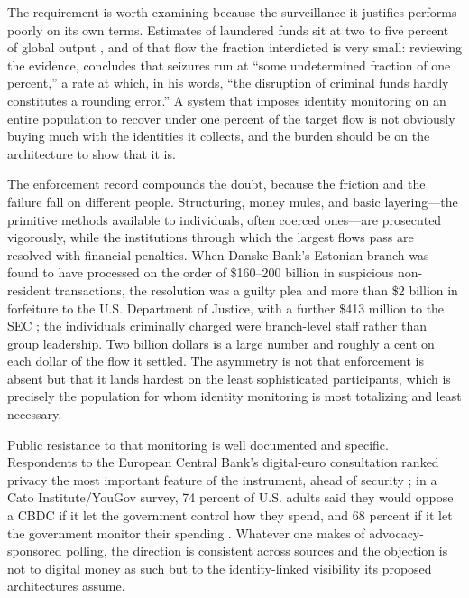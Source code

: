 \documentclass[11pt]{article}
\begin{document}
The requirement is worth examining because the surveillance it justifies performs poorly on its own
terms. Estimates of laundered funds sit at two to five percent of global output \citep{UNODC2011},
and of that flow the fraction interdicted is very small: reviewing the evidence, \citet{Pol2020}
concludes that seizures run at ``some undetermined fraction of one percent,'' a rate at which, in his
words, ``the disruption of criminal funds hardly constitutes a rounding error.'' A system that
imposes identity monitoring on an entire population to recover under one percent of the target flow
is not obviously buying much with the identities it collects, and the burden should be on the
architecture to show that it is.

The enforcement record compounds the doubt, because the friction and the failure fall on different
people. Structuring, money mules, and basic layering---the primitive methods available to
individuals, often coerced ones---are prosecuted vigorously, while the institutions through which the
largest flows pass are resolved with financial penalties. When Danske Bank's Estonian branch was
found to have processed on the order of \$160--200 billion in suspicious non-resident transactions,
the resolution was a guilty plea and more than \$2 billion in forfeiture to the U.S. Department of
Justice, with a further \$413 million to the SEC \citep{Lynch2022}; the individuals criminally
charged were branch-level staff rather than group leadership. Two billion dollars is a large number
and roughly a cent on each dollar of the flow it settled. The asymmetry is not that enforcement is
absent but that it lands hardest on the least sophisticated participants, which is precisely the
population for whom identity monitoring is most totalizing and least necessary.

Public resistance to that monitoring is well documented and specific. Respondents to the European
Central Bank's digital-euro consultation ranked privacy the most important feature of the instrument,
ahead of security \citep{ECBConsultation2021}; in a Cato Institute/YouGov survey, 74 percent of U.S. adults said
they would oppose a CBDC if it let the government control how they spend, and 68 percent if it let the
government monitor their spending \citep{CatoCBDC2023}. Whatever one makes of advocacy-sponsored
polling, the direction is consistent across sources and the objection is not to digital money as such
but to the identity-linked visibility its proposed architectures assume.
\end{document}
